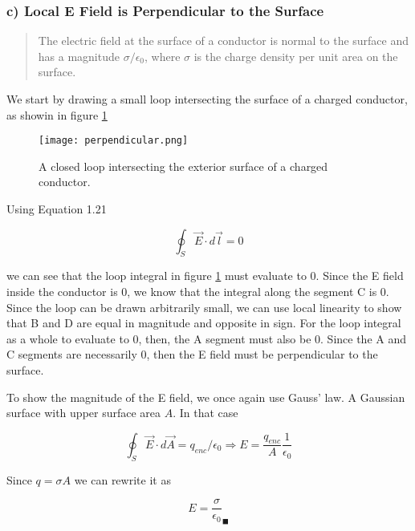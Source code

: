 \subsubsection*{c) Local E Field is Perpendicular to the Surface}

\begin{quote}
The electric field at the surface of a conductor is normal to the
surface and has a magnitude $\sigma / \epsilon_0$, where $\sigma$ is
the charge density per unit area on the surface.
\end{quote}

We start by drawing a small loop intersecting the surface of a charged
conductor, as showin in figure \ref{fig:1:1:loopy}

\begin{figure}
  \texttt{[image: perpendicular.png]}
  \caption{A closed loop intersecting the exterior surface of a
    charged conductor.}
\label{fig:1:1:loopy}
\end{figure}

Using Equation 1.21

\begin{equation}
  \oint_S \vec{E} \cdot d\vec{l} = 0
\end{equation}

we can see that the loop integral in figure \ref{fig:1:1:loopy} must
evaluate to 0.  Since the E field inside the conductor is 0, we know
that the integral along the segment C is 0.  Since the loop can be
drawn arbitrarily small, we can use local linearity to show that B and
D are equal in magnitude and opposite in sign.  For the loop integral
as a whole to evaluate to 0, then, the A segment must also be 0.
Since the A and C segments are necessarily 0, then the E field must be
perpendicular to the surface.

To show the magnitude of the E field, we once again use Gauss' law.  A
Gaussian surface with upper surface area $A$.  In that case

\begin{equation}
  \oint_S{\vec{E} \cdot d\vec{A} = q_{enc} / \epsilon_0}
  \Rightarrow E = \frac{q_{enc}}{A} \frac{1}{\epsilon_0}
\end{equation}

Since $q = \sigma A$ we can rewrite it as

\begin{equation}
  E = \frac{\sigma}{\epsilon_0} _\blacksquare
\end{equation}
